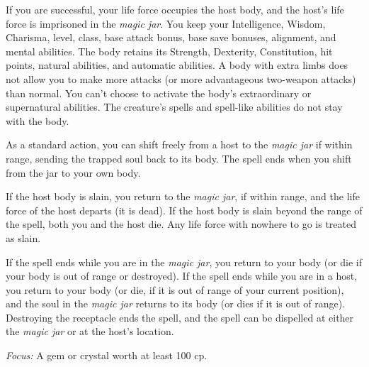 {	If you are successful, your life force occupies the host body, and the host's life force is imprisoned in the \emph{magic jar}. You keep your Intelligence, Wisdom, Charisma, level, class, base attack bonus, base save bonuses, alignment, and mental abilities. The body retains its Strength, Dexterity, Constitution, hit points, natural abilities, and automatic abilities. A body with extra limbs does not allow you to make more attacks (or more advantageous two-weapon attacks) than normal. You can't choose to activate the body's extraordinary or supernatural abilities. The creature's spells and spell-like abilities do not stay with the body.

	As a standard action, you can shift freely from a host to the \emph{magic jar} if within range, sending the trapped soul back to its body. The spell ends when you shift from the jar to your own body.

	If the host body is slain, you return to the \emph{magic jar}, if within range, and the life force of the host departs (it is dead). If the host body is slain beyond the range of the spell, both you and the host die. Any life force with nowhere to go is treated as slain.

	If the spell ends while you are in the \emph{magic jar}, you return to your body (or die if your body is out of range or destroyed). If the spell ends while you are in a host, you return to your body (or die, if it is out of range of your current position), and the soul in the \emph{magic jar} returns to its body (or dies if it is out of range). Destroying the receptacle ends the spell, and the spell can be dispelled at either the \emph{magic jar} or at the host's location.

	\textit{Focus:}
	A gem or crystal worth at least 100 cp.

}
